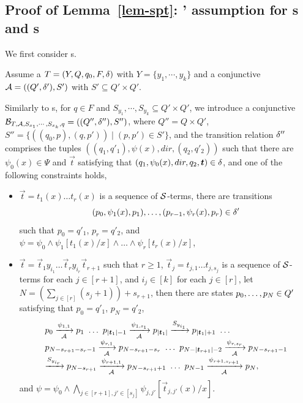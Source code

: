 
\subsection{Proof of Lemma~\ref{lem-spt}: \prerec' assumption for \SSPT{}s and \SPT{}s}

We first consider \SSPT{}s. 

Assume a \SSPT{} $T=(Y, Q, q_0, F, \delta)$ with $Y = \{y_1,\cdots, y_k\}$ and a conjunctive \SA{} $\mathcal{A} = ((Q', \delta'), S')$ with $S' \subseteq Q' \times Q'$. 

Similarly to \FFA{}s, for $q \in F$ and  $S_{y_1}, \cdots, S_{y_k} \subseteq Q' \times Q'$, we  introduce a conjunctive \SSA{} $\mathcal{B}_{T, \mathcal{A}, S_{x_1}, \cdots, S_{x_k}, q} = ((Q'', \delta''), S'')$, where $Q'' = Q \times Q'$, $S'' = \{((q_0, p), (q, p')) \mid (p, p') \in S'\}$, and the transition relation $\delta''$ comprises the tuples 
$((q_1, q'_1), \psi(x), dir, (q_2, q'_2))$ such that there are $\psi_0(x) \in \Psi$ and $\vec{t}$ satisfying that $(q_1, \psi_0(x), dir, q_2, \vec{t}) \in \transrel$, and one of the following constraints holds, 
\begin{itemize}
\item $\vec{t} = t_1(x) \ldots t_r(x)$ is a sequence of $\mathcal{S}$-terms, there are transitions 
$$(p_{0}, \psi_1(x), p_{1}), \ldots, (p_{r-1}, \psi_r(x), p_r) \in \delta'$$ 
such that $p_0 = q'_1$, $p_r = q'_2$, and $\psi = \psi_0 \wedge \psi_1[t_1(x)/x] \wedge \ldots \wedge \psi_r[t_r(x)/x]$,
%
\item $\vec{t} = \vec{t}_1 y_{i_1} \ldots \vec{t}_{r} y_{i_{r}} \vec{t}_{r+1}$ such that $r \ge 1$, $\vec{t}_j = t_{j, 1} \ldots t_{j, s_j}$ is a sequence of $\mathcal{S}$-terms for each $j \in [r+1]$,  and $i_j \in [k]$ for each $j \in [r]$, let $N = (\sum \limits_{j \in [r]} (s_j+ 1)) +s_{r+1}$, then there are states $p_0, \ldots, p_{N} \in Q'$ satisfying that $p_0 = q'_1$, $p_{N} = q'_2$,  
%
$$
\begin{array}{l}
p_0 \xrightarrow[\Aut]{\psi_{1,1}} p_1\ \ldots\ p_{|\vec{t}_1|-1} \xrightarrow[\Aut]{\psi_{1, s_1}} p_{|\vec{t}_1|} \xrightarrow{S_{y_{i_1}}} p_{|\vec{t}_1|+1}\ \ldots\\
p_{N - s_{r+1} - s_r -1} \xrightarrow[\Aut]{\psi_{r, 1}} p_{N - s_{r+1} - s_r } \ \ldots\ p_{N - |\vec{t}_{r+1}| - 2} \xrightarrow[\Aut]{\psi_{r, s_r}} p_{N-s_{r+1}-1}\\
 \xrightarrow{S_{y_{i_r}}} p_{N- s_{r+1}} \xrightarrow[\Aut]{\psi_{r+1, 1}} p_{N -s_{r+1}+1}\ \ldots\ p_{N - 1} \xrightarrow[\Aut]{\psi_{r+1,  s_{r+1}} } p_{N},
\end{array}
 $$ 
 and $\psi = \psi_0 \wedge \bigwedge \limits_{j \in [r+1], j' \in [s_j]} \psi_{j, j'} [\vec{t}_{j, j'}(x)/x].$
\end{itemize}
